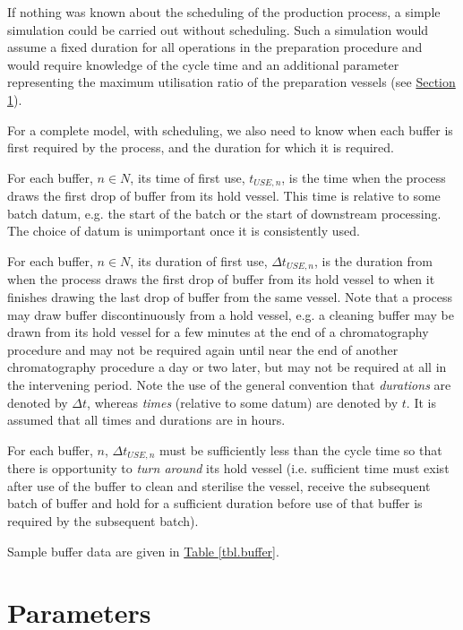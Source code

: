 If nothing was known about the scheduling of the production process, a simple
simulation could be carried out without scheduling.
Such a simulation would assume a fixed duration for all operations in the
preparation procedure and would require knowledge of the cycle time and an
additional parameter representing the maximum utilisation ratio of the
preparation vessels (see \hyperref[S.parameters]{Section \ref*{S.parameters}}).

For a complete model, with scheduling, we also need to know when each buffer
is first required by the process, and the duration for which it is required.

For each buffer, $n \in N$, its time of first use, $t_{\mathit{USE},n}$, is the
time when the process draws the first drop of buffer from its hold vessel.
This time is relative to some batch datum, e.g. the start of the batch or the
start of downstream processing.
The choice of datum is unimportant once it is consistently used.

For each buffer, $n \in N$, its duration of first use,
$\Delta t_{\mathit{USE},n}$, is the duration from when the process draws the
first drop of buffer from its hold vessel to when it finishes drawing the last
drop of buffer from the same vessel.
Note that a process may draw buffer discontinuously from a hold vessel, e.g. a
cleaning buffer may be drawn from its hold vessel for a few minutes at the end
of a chromatography procedure and may not be required again until near the end
of another chromatography procedure a day or two later, but may not be required
at all in the intervening period.
Note the use of the general convention that \emph{durations} are denoted by
$\Delta t$, whereas \emph{times} (relative to some datum) are denoted by $t$.
It is assumed that all times and durations are in hours.

For each buffer, $n$, $\Delta t_{\mathit{USE},n}$ must be sufficiently less
than the cycle time so that there is opportunity to \emph{turn around} its hold
vessel (i.e. sufficient time must exist after use of the buffer to clean and
sterilise the vessel, receive the subsequent batch of buffer and hold for a
sufficient duration before use of that buffer is required by the subsequent
batch).

Sample buffer data are given in \hyperref[tbl.buffer]{Table \ref*{tbl.buffer}}.

\section{Parameters}\label{S.parameters}

